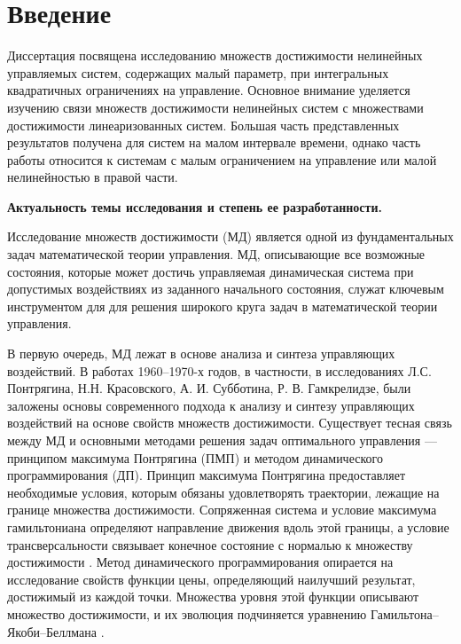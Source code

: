 \documentclass[../main.tex]{subfiles}
\begin{document}
\clearpage
\section*{Введение}
Диссертация посвящена исследованию множеств достижимости нелинейных управляемых систем, содержащих малый параметр, при интегральных квадратичных  ограничениях на управление.
Основное внимание уделяется изучению связи множеств достижимости нелинейных систем с множествами достижимости линеаризованных систем. 
Большая часть представленных результатов получена для систем на малом интервале времени, однако часть работы относится к системам с малым ограничением на управление или малой нелинейностью в правой части. 

\textbf{Актуальность темы исследования и степень ее разработанности.} 

Исследование множеств достижимости (МД) является одной из фундаментальных задач математической теории управления. 
МД, описывающие все возможные состояния, которые может достичь управляемая динамическая система при допустимых воздействиях из заданного начального состояния, служат ключевым инструментом для для решения широкого круга задач в математической теории управления. 

В первую очередь, МД лежат в основе анализа и синтеза управляющих воздействий. 
В работах 1960–1970-х годов, в частности, в исследованиях Л.С. Понтрягина, Н.Н. Красовского, А. И. Субботина,  Р. В. Гамкрелидзе, \cite{Pontryagin1961, Pontryagin1967, Kras_book, KrasSub}  были заложены основы современного подхода к анализу и синтезу управляющих воздействий на основе свойств множеств достижимости.
Существует тесная связь между МД и основными методами решения задач оптимального управления --- принципом максимума Понтрягина (ПМП) и методом динамического программирования (ДП).
Принцип максимума Понтрягина предоставляет необходимые условия, которым обязаны удовлетворять траектории, лежащие на границе множества достижимости. 
Сопряженная система и условие максимума гамильтониана определяют направление движения вдоль этой границы, а условие трансверсальности связывает конечное состояние с нормалью к множеству достижимости \cite{Pontryagin1961, Lee}.
Метод динамического программирования опирается на исследование свойств функции цены, определяющий наилучший результат, достижимый из каждой точки. 
Множества уровня этой функции описывают множество достижимости, и их эволюция подчиняется уравнению Гамильтона–Якоби–Беллмана \cite{Bellman, Kurzhanski1977, GurmanDuhta}. 
\end{document}
